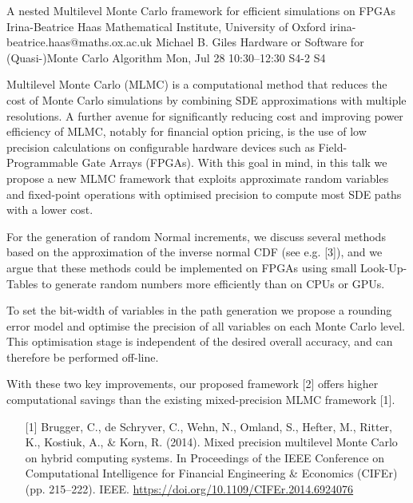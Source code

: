 \begin{talk}
  {A nested Multilevel Monte Carlo framework for efficient simulations on FPGAs}%
  {Irina-Beatrice Haas}%
  {Mathematical Institute, University of Oxford}%
  {irina-beatrice.haas@maths.ox.ac.uk}%
  {Michael B. Giles}%
  {Hardware or Software for (Quasi-)Monte Carlo Algorithm}%
  {Mon, Jul 28 10:30–12:30}%
  {S4-2}%
  {S4}%
				
			

Multilevel Monte Carlo (MLMC) is a computational method that reduces the cost of Monte Carlo simulations by combining SDE approximations with multiple resolutions. A further avenue for significantly reducing cost and improving power efficiency of MLMC, notably for financial option pricing, is the use of low precision calculations on configurable hardware devices such as Field-Programmable Gate Arrays (FPGAs). With this goal in mind, in this talk we propose a new MLMC framework that exploits approximate random variables and fixed-point operations with optimised precision to compute most SDE paths with a lower cost.

For the generation of random Normal increments, we discuss several methods based on the approximation of the inverse normal CDF (see e.g. [3]), and we argue that these methods could be implemented on FPGAs using small Look-Up-Tables to generate random numbers more efficiently than on CPUs or GPUs. 

To set the bit-width of variables in the path generation we propose a rounding error model and optimise the precision of all variables on each Monte Carlo level. This optimisation stage is independent of the desired overall accuracy, and can therefore be performed off-line. 

With these two key improvements, our proposed framework [2] offers higher computational
savings than the existing mixed-precision MLMC framework [1].


\medskip


\begin{enumerate}

    \item[{[1]}] Brugger, C., de Schryver, C., Wehn, N., Omland, S., Hefter, M., Ritter, K., Kostiuk, A., \& Korn, R. (2014). Mixed precision multilevel Monte Carlo on hybrid computing systems. In Proceedings of the IEEE Conference on Computational Intelligence for Financial Engineering \& Economics (CIFEr) (pp. 215–222). IEEE. \url{https://doi.org/10.1109/CIFEr.2014.6924076}
    

\end{enumerate}
\end{talk}
